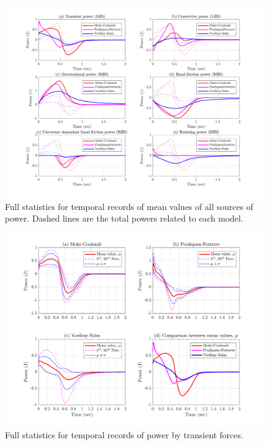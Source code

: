 \documentclass{article}
\begin{document}
\begin{figure}[H]
        \centering
        \includegraphics[width=1\textwidth]{InclinedPlane/GlobalRecords/Powerall.png}
        \caption{Full statistics for temporal records of mean values of all sources of power. Dashed lines are the total powers related to each model.}
        \label{fig:Ramp-PowerAll}
\end{figure}

\begin{figure}[H]
        \centering
        \includegraphics[width=1\textwidth]{InclinedPlane/GlobalRecords/Ptrns.png}
        \caption{Full statistics for temporal records of power by transient forces.}
        \label{fig:Ramp-Ptrns}
\end{figure}
\end{document}
